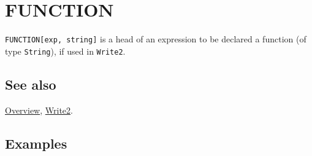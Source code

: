 \documentclass[../FeynCalcManual.tex]{subfiles}
\begin{document}
\hypertarget{function}{%
\section{FUNCTION}\label{function}}

\texttt{FUNCTION[\allowbreak{}exp,\ \allowbreak{}string]} is a head of
an expression to be declared a function (of type \texttt{String}), if
used in \texttt{Write2}.

\subsection{See also}

\hyperlink{toc}{Overview}, \hyperlink{write2}{Write2}.

\subsection{Examples}
\end{document}
